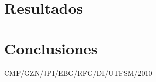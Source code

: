 \documentclass[conference]{IEEEtran}
\begin{document}
\section{Resultados}
\label{sec:resultados}


\section{Conclusiones}
\label{sec:conclusiones}


%




\vfill \hfill CMF/GZN/JPI/EBG/RFG/DI/UTFSM/2010
\end{document}
